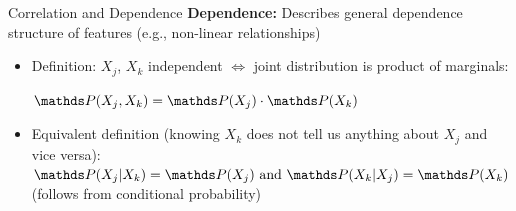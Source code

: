 \documentclass[11pt,compress,t,notes=noshow, aspectratio=169, xcolor=table]{beamer}
\begin{document}
\begin{frame}{Correlation and Dependence}
\textbf{Dependence:} Describes general dependence structure of features (e.g., non-linear relationships)

\begin{itemize}
\item Definition: $X_j$, $X_k$ independent $\Leftrightarrow$ joint distribution is product of marginals:\\ \vspace{5pt}
\centerline{$\P(X_j, X_k) = \P(X_j) \cdot \P(X_k)$}
\vspace{5pt}
\item Equivalent definition (knowing $X_k$ does not tell us anything about $X_j$ and vice versa): \\
\vspace{5pt}
\phantom{AAA} $\P(X_j|X_k) = \P(X_j) \text{ and } \P(X_k|X_j) = \P(X_k)$ \hfill (follows from conditional probability) \phantom{AAA}
\vspace{5pt}



\end{itemize}
\end{frame}
\end{document}
